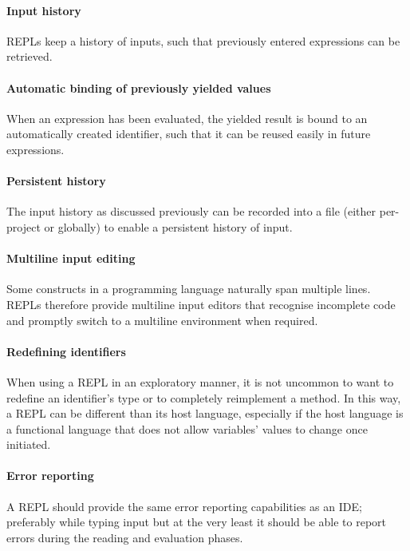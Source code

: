 \paragraph{Input history} REPLs keep a history of inputs, such that previously
entered expressions can be retrieved.

\paragraph{Automatic binding of previously yielded values} When an expression
has been evaluated, the yielded result is bound to an automatically created
identifier, such that it can be reused easily in future expressions.

\paragraph{Persistent history} The input history as discussed previously can be
recorded into a file (either per-project or globally) to enable a persistent
history of input.

\paragraph{Multiline input editing} Some constructs in a programming language
naturally span multiple lines. REPLs therefore provide multiline input editors
that recognise incomplete code and promptly switch to a multiline environment
when required.

\paragraph{Redefining identifiers} When using a REPL in an exploratory manner,
it is not uncommon to want to redefine an identifier's type or to completely
reimplement a method. In this way, a REPL can be different than its host
language, especially if the host language is a functional language that does not
allow variables' values to change once initiated.

\paragraph{Error reporting} A REPL should provide the same error reporting
capabilities as an IDE; preferably while typing input but at the very least it
should be able to report errors during the reading and evaluation phases.


